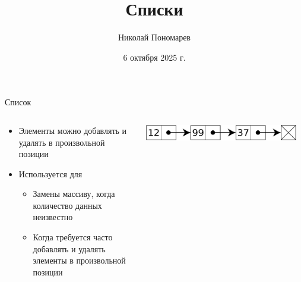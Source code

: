 \documentclass[aspectratio=169]{beamer}
\title{Списки}
\author{Николай Пономарев}
\date{6 октября 2025 г.}
\begin{document}
\begin{frame}
    \titlepage
\end{frame}

\begin{frame}{Список}
    \begin{columns}
        \begin{column}{0.55\textwidth}
            \begin{itemize}
                \item Элементы можно добавлять и удалять в произвольной позиции
                \item Используется для
                      \begin{itemize}
                          \item Замены массиву, когда количество данных неизвестно
                          \item Когда требуется часто добавлять и удалять элементы в произвольной позиции
                      \end{itemize}
            \end{itemize}
        \end{column}
        \begin{column}{0.45\textwidth}
            \begin{center}
                \includegraphics[width=0.95\textwidth]{list.pdf}

                \begin{tiny}
                \end{tiny}
            \end{center}
        \end{column}
    \end{columns}
\end{frame}
\end{document}
